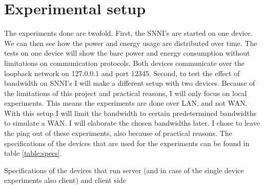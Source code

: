 \documentclass[../thesis.tex]{subfiles}
\begin{document}





\section{Experimental setup}
The experiments done are twofold. First, the SNNI's are started on one device. We can then see how the power and energy usage are distributed over time. The tests on one device will show the bare power and energy consumption without limitations on communication protocols. Both devices communicate over the loopback network on 127.0.0.1 and port 12345. Second, to test the effect of bandwidth on SNNI's I will make a different setup with two devices. Because of the limitations of this project and practical reasons, I will only focus on local experiments. This means the experiments are done over LAN, and not WAN. With this setup I will limit the bandwidth to certain predetermined bandwidths to simulate a WAN. I will elaborate the chosen bandwidths later. I chose to leave the ping out of these experiments, also because of practical reasons. The specifications of the devices that are used for the experiments can be found in table \ref{table:specs}.

\begin{table}[]
    \begin{adjustbox}{width=\columnwidth,center}
        
    \end{adjustbox}
    \caption{Specifications of the devices that run server (and in case of the single device experiments also client) and client side}
    \label{table:specs}
\end{table}
\end{document}
